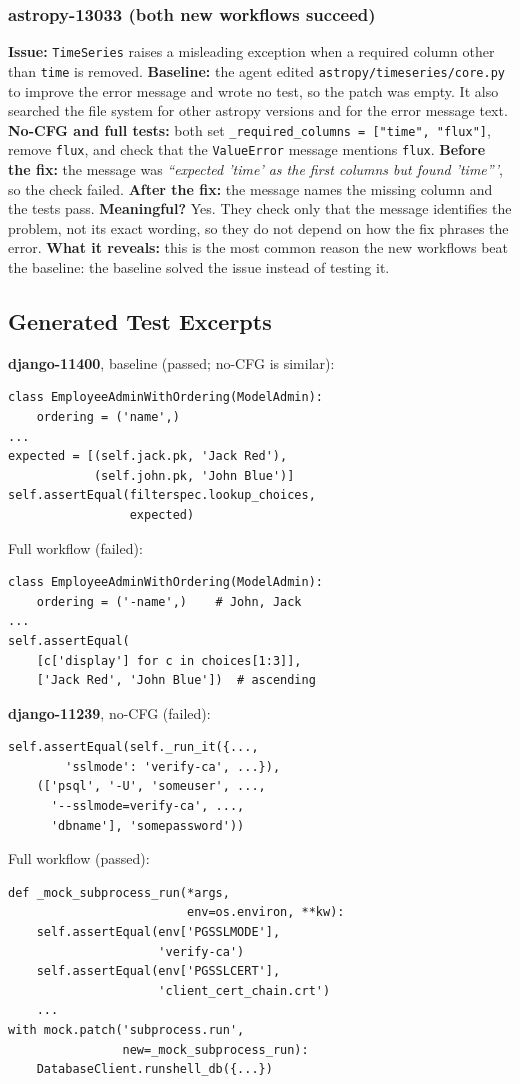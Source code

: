 \documentclass[conference]{IEEEtran}
\begin{document}
\subsubsection{astropy-13033 (both new workflows succeed)}
\textbf{Issue:} \texttt{TimeSeries} raises a misleading exception when a required column other than \texttt{time} is removed. \textbf{Baseline:} the agent edited \texttt{astropy/timeseries/core.py} to improve the error message and wrote no test, so the patch was empty. It also searched the file system for other astropy versions and for the error message text. \textbf{No-CFG and full tests:} both set \texttt{\_required\_columns = ["time", "flux"]}, remove \texttt{flux}, and check that the \texttt{ValueError} message mentions \texttt{flux}. \textbf{Before the fix:} the message was \textit{``expected 'time' as the first columns but found 'time'''}, so the check failed. \textbf{After the fix:} the message names the missing column and the tests pass. \textbf{Meaningful?} Yes. They check only that the message identifies the problem, not its exact wording, so they do not depend on how the fix phrases the error. \textbf{What it reveals:} this is the most common reason the new workflows beat the baseline: the baseline solved the issue instead of testing it.

\subsection{Generated Test Excerpts}
\label{app:tests}
\textbf{django-11400}, baseline (passed; no-CFG is similar):
{\footnotesize
\begin{verbatim}
class EmployeeAdminWithOrdering(ModelAdmin):
    ordering = ('name',)
...
expected = [(self.jack.pk, 'Jack Red'),
            (self.john.pk, 'John Blue')]
self.assertEqual(filterspec.lookup_choices,
                 expected)
\end{verbatim}}
\noindent Full workflow (failed):
{\footnotesize
\begin{verbatim}
class EmployeeAdminWithOrdering(ModelAdmin):
    ordering = ('-name',)    # John, Jack
...
self.assertEqual(
    [c['display'] for c in choices[1:3]],
    ['Jack Red', 'John Blue'])  # ascending
\end{verbatim}}

\textbf{django-11239}, no-CFG (failed):
{\footnotesize
\begin{verbatim}
self.assertEqual(self._run_it({...,
        'sslmode': 'verify-ca', ...}),
    (['psql', '-U', 'someuser', ...,
      '--sslmode=verify-ca', ...,
      'dbname'], 'somepassword'))
\end{verbatim}}
\noindent Full workflow (passed):
{\footnotesize
\begin{verbatim}
def _mock_subprocess_run(*args,
                         env=os.environ, **kw):
    self.assertEqual(env['PGSSLMODE'],
                     'verify-ca')
    self.assertEqual(env['PGSSLCERT'],
                     'client_cert_chain.crt')
    ...
with mock.patch('subprocess.run',
                new=_mock_subprocess_run):
    DatabaseClient.runshell_db({...})
\end{verbatim}}
\end{document}
